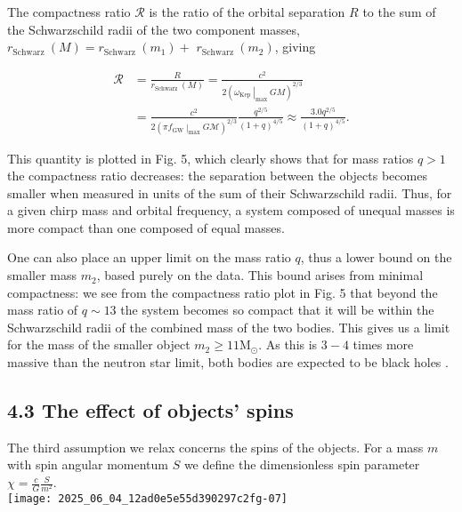 \documentclass[10pt]{article}
\begin{document}
The compactness ratio $\mathscr{R}$ is the ratio of the orbital separation $R$ to the sum of the Schwarzschild radii of the two component masses, $r_{\text {Schwarz }}(M)=r_{\text {Schwarz }}\left(m_{1}\right)+$ $r_{\text {Schwarz }}\left(m_{2}\right)$, giving


\begin{align*}
\mathscr{R} & =\frac{R}{r_{\text {Schwarz }}(M)}=\frac{c^{2}}{2\left(\left.\omega_{\text {Kep }}\right|_{\text {max }} G M\right)^{2 / 3}} \\
& =\frac{c^{2}}{2\left(\left.\pi f_{\text {GW }}\right|_{\text {max }} G \mathscr{M}\right)^{2 / 3}} \frac{q^{2 / 5}}{(1+q)^{4 / 5}} \approx \frac{3.0 q^{2 / 5}}{(1+q)^{4 / 5}} . \tag{11}
\end{align*}


This quantity is plotted in Fig. 5, which clearly shows that for mass ratios $q>1$ the compactness ratio decreases: the separation between the objects becomes smaller when measured in units of the sum of their Schwarzschild radii. Thus, for a given chirp mass and orbital frequency, a system composed of unequal masses is more compact than one composed of equal masses.

One can also place an upper limit on the mass ratio $q$, thus a lower bound on the smaller mass $m_{2}$, based purely on the data. This bound arises from minimal compactness: we see from the compactness ratio plot in Fig. 5 that beyond the mass ratio of $q \sim 13$ the system becomes so compact that it will be within the Schwarzschild radii of the combined mass of the two bodies. This gives us a limit for the mass of the smaller object $m_{2} \geq 11 \mathrm{M}_{\odot}$. As this is $3-4$ times more massive than the neutron star limit, both bodies are expected to be black holes .

\subsection*{4.3 The effect of objects' spins}
The third assumption we relax concerns the spins of the objects. For a mass $m$ with spin angular momentum $S$ we define the dimensionless spin parameter\\
$\chi=\frac{c}{G} \frac{S}{m^{2}}$.\\
\texttt{[image: 2025\_06\_04\_12ad0e5e55d390297c2fg-07]}
\end{document}
